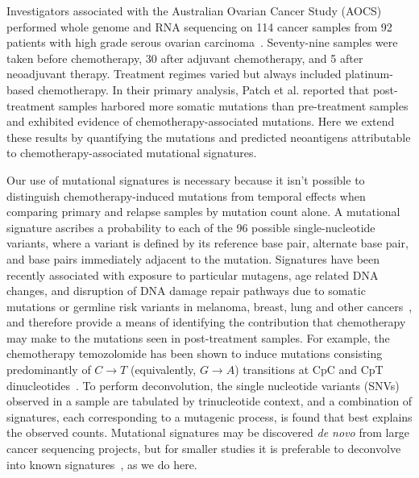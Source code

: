 Investigators associated with the Australian Ovarian Cancer Study (AOCS) performed whole genome and RNA sequencing on 114 cancer samples from 92 patients with high grade serous ovarian carcinoma~\cite{Patch_2015}. Seventy-nine samples were taken before chemotherapy, 30 after adjuvant chemotherapy, and 5 after neoadjuvant therapy. Treatment regimes varied but always included platinum-based chemotherapy. In their primary analysis, Patch et al. reported that post-treatment samples harbored more somatic mutations than pre-treatment samples and exhibited evidence of chemotherapy-associated mutations. Here we extend these results by quantifying the mutations and predicted neoantigens attributable to chemotherapy-associated mutational signatures.

Our use of mutational signatures is necessary because it isn't possible to distinguish chemotherapy-induced mutations from temporal effects when comparing primary and relapse samples by mutation count alone. A mutational signature ascribes a probability to each of the 96 possible single-nucleotide variants, where a variant is defined by its reference base pair, alternate base pair, and base pairs immediately adjacent to the mutation. Signatures have been recently associated with exposure to particular mutagens, age related DNA changes, and disruption of DNA damage repair pathways due to somatic mutations or germline risk variants in melanoma, breast, lung and other cancers~\cite{Alexandrov2013}, and therefore provide a means of identifying the contribution that chemotherapy may make to the mutations seen in post-treatment samples. For example, the chemotherapy temozolomide has been shown to induce mutations consisting predominantly of $C \rightarrow T$ (equivalently, $G \rightarrow A$) transitions at CpC and CpT dinucleotides~\cite{Johnson_2013}. To perform deconvolution, the single nucleotide variants (SNVs) observed in a sample are tabulated by trinucleotide context, and a combination of signatures, each corresponding to a mutagenic process, is found that best explains the observed counts. Mutational signatures may be discovered \textit{de novo} from large cancer sequencing projects, but for smaller studies it is preferable to deconvolve into known signatures~\cite{Rosenthal_2016}, as we do here.


